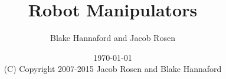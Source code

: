 \documentclass[oneside]{book}
\begin{document}
\setpagewiselinenumbers
\modulolinenumbers[5]

\setcounter{chapter}{0}


 \title{Robot Manipulators}

 \author{Blake Hannaford and Jacob Rosen}

 \date{\today\\(C) Copyright 2007-2015 Jacob Rosen and Blake Hannaford}

 \maketitle

\tableofcontents

\mainmatter

\linenumbers
%
%
%
%


%
%
% 
% 
%  
% 
% 
% 

\appendix



%
\label{LastPage}
\end{document}
